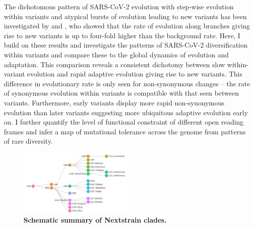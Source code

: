 \documentclass[aps,rmp, twocolumn]{revtex4}
\begin{document}
The dichotomous pattern of SARS-CoV-2 evolution with step-wise evolution within variants and atypical bursts of evolution leading to new variants has been investigated by \citet{tay_emergence_2022} and \citet{hill_origins_2022}, who showed that the rate of evolution along branches giving rise to new variants is up to four-fold higher than the background rate.
Here, I build on these results and investigate the patterns of SARS-CoV-2 diversification within variants and compare these to the global dynamics of evolution and adaptation.
This comparison reveals a consistent dichotomy between slow within-variant evolution and rapid adaptive evolution giving rise to new variants.
This difference in evolutionary rate is only seen for non-synonymous changes -- the rate of synonymous evolution within variants is compatible with that seen between variants.
Furthermore, early variants display more rapid non-synonymous evolution than later variants suggesting more ubiquitous adaptive evolution early on.
I further quantify the level of functional constraint of different open reading frames and infer a map of mutational tolerance across the genome from patterns of rare diversity.

\begin{figure}
    \includegraphics[width=0.5\textwidth]{figures/clade_overview.png}
    \caption{{\bf Schematic summary of Nextstrain clades.}\label{fig:clade_overview}}
\end{figure}
\end{document}
